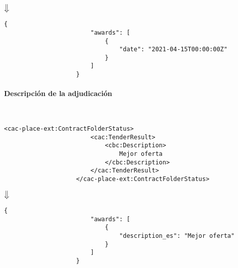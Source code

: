                 \begin{center}
                    $\big\Downarrow$
                \end{center}
                
                \begin{lstlisting}[language=lJSON]
                    {
                        "awards": [
                            {
                                "date": "2021-04-15T00:00:00Z"
                            }
                        ]
                    }
                \end{lstlisting}
                
            \paragraph{Descripción de la adjudicación} \mbox{}\\
                \begin{lstlisting}[language=lXML]
                    <cac-place-ext:ContractFolderStatus>
                        <cac:TenderResult>
                            <cbc:Description>
                                Mejor oferta
                            </cbc:Description>
                        </cac:TenderResult>
                    </cac-place-ext:ContractFolderStatus>
                \end{lstlisting}
                
                \begin{center}
                    $\big\Downarrow$
                \end{center}
                
                \begin{lstlisting}[language=lJSON]
                    {
                        "awards": [
                            {
                                "description_es": "Mejor oferta"
                            }
                        ]
                    }
                \end{lstlisting}
                
\newpage